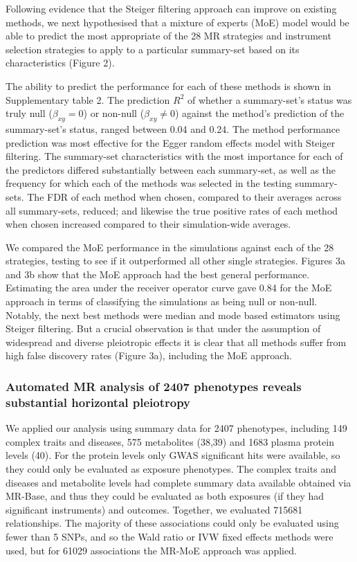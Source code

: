 \documentclass[]{article}
\begin{document}
Following evidence that the Steiger filtering approach can improve on
existing methods, we next hypothesised that a mixture of experts (MoE)
model would be able to predict the most appropriate of the 28 MR
strategies and instrument selection strategies to apply to a particular
summary-set based on its characteristics (Figure 2).

The ability to predict the performance for each of these methods is
shown in Supplementary table 2. The prediction \(R^2\) of whether a
summary-set's status was truly null (\(\beta_{xy}=0\)) or non-null
(\(\beta_{xy} \neq 0\)) against the method's prediction of the
summary-set's status, ranged between 0.04 and 0.24. The method
performance prediction was most effective for the Egger random effects
model with Steiger filtering. The summary-set characteristics with the
most importance for each of the predictors differed substantially
between each summary-set, as well as the frequency for which each of the
methods was selected in the testing summary-sets. The FDR of each method
when chosen, compared to their averages across all summary-sets,
reduced; and likewise the true positive rates of each method when chosen
increased compared to their simulation-wide averages.

We compared the MoE performance in the simulations against each of the
28 strategies, testing to see if it outperformed all other single
strategies. Figures 3a and 3b show that the MoE approach had the best
general performance. Estimating the area under the receiver operator
curve gave 0.84 for the MoE approach in terms of classifying the
simulations as being null or non-null. Notably, the next best methods
were median and mode based estimators using Steiger filtering. But a
crucial observation is that under the assumption of widespread and
diverse pleiotropic effects it is clear that all methods suffer from
high false discovery rates (Figure 3a), including the MoE approach.

\subsubsection{Automated MR analysis of 2407 phenotypes reveals
substantial horizontal
pleiotropy}\label{automated-mr-analysis-of-2407-phenotypes-reveals-substantial-horizontal-pleiotropy}

We applied our analysis using summary data for 2407 phenotypes,
including 149 complex traits and diseases, 575 metabolites (38,39) and
1683 plasma protein levels (40). For the protein levels only GWAS
significant hits were available, so they could only be evaluated as
exposure phenotypes. The complex traits and diseases and metabolite
levels had complete summary data available obtained via MR-Base, and
thus they could be evaluated as both exposures (if they had significant
instruments) and outcomes. Together, we evaluated 715681 relationships.
The majority of these associations could only be evaluated using fewer
than 5 SNPs, and so the Wald ratio or IVW fixed effects methods were
used, but for 61029 associations the MR-MoE approach was applied.
\end{document}
